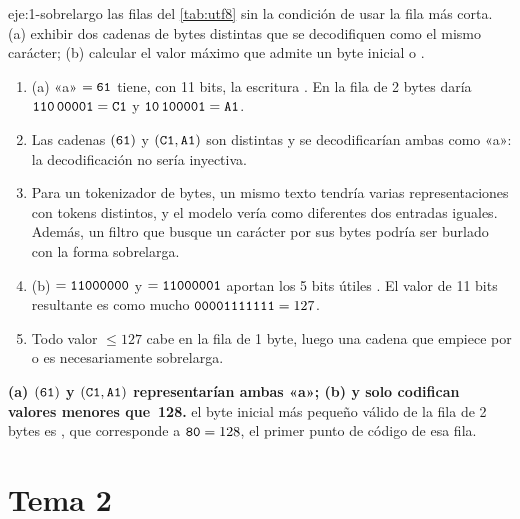 \begin{solucion}{eje:1-sobrelargo}
\datos las filas del \cref{tab:utf8} sin la condición de usar la fila más corta.
\planteamiento (a) exhibir dos cadenas de bytes distintas que se decodifiquen como el mismo carácter; (b) calcular el valor máximo que admite un byte inicial  o .
\pasos
\begin{enumerate}[label=\arabic*.]
  \item (a) «a» $=\texttt{61}$ tiene, con 11 bits, la escritura . En la fila de 2 bytes daría $\texttt{110}\,\texttt{00001}=\texttt{C1}$ y $\texttt{10}\,\texttt{100001}=\texttt{A1}$.
  \item Las cadenas $(\texttt{61})$ y $(\texttt{C1},\texttt{A1})$ son distintas y se decodificarían ambas como «a»: la decodificación no sería inyectiva.
  \item Para un tokenizador de bytes, un mismo texto tendría varias representaciones con tokens distintos, y el modelo vería como diferentes dos entradas iguales. Además, un filtro que busque un carácter por sus bytes podría ser burlado con la forma sobrelarga.
  \item (b)  $=\texttt{11000000}$ y  $=\texttt{11000001}$ aportan los 5 bits útiles . El valor de 11 bits resultante es como mucho $\texttt{00001111111}=127$.
  \item Todo valor $\le 127$ cabe en la fila de 1 byte, luego una cadena que empiece por  o  es necesariamente sobrelarga.
\end{enumerate}
\resultado \textbf{(a) $(\texttt{61})$ y $(\texttt{C1},\texttt{A1})$ representarían ambas «a»; (b)  y  solo codifican valores menores que~128.}
\comprobacion el byte inicial más pequeño válido de la fila de 2 bytes es , que corresponde a $\texttt{80}=128$, el primer punto de código de esa fila.
\end{solucion}

\section{Tema 2}

